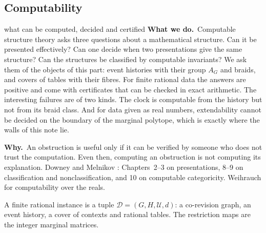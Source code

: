 \documentclass[11pt]{article}
\theoremstyle{definition}\newtheorem{definition}[theorem]{Definition}\newtheorem{remark}[theorem]{Remark}\newtheorem{example}[theorem]{Example}\newtheorem{problem}[theorem]{Open problem}\crefname{problem}{Problem}{Problems}
\newcommand{\rbwhat}{\textcolor{rbWhat}{\textbf{What we do.}}~}\newcommand{\rbwhy}{\par\smallskip\textcolor{rbWhy}{\textbf{Why.}}~}
\begin{document}
\subsection{Computability}\label{sec:computability}
\begin{readerbox}{what can be computed, decided and certified}
\rbwhat Computable structure theory asks three questions about a mathematical structure. Can it be presented effectively? Can one decide when two presentations give the same structure? Can the structures be classified by computable invariants? We ask them of the objects of this part: event histories with their group $A_G$ and braids, and covers of tables with their fibres. For finite rational data the answers are positive and come with certificates that can be checked in exact arithmetic. The interesting failures are of two kinds. The clock is computable from the history but not from its braid class. And for data given as real numbers, extendability cannot be decided on the boundary of the marginal polytope, which is exactly where the walls of this note lie.
\rbwhy An obstruction is useful only if it can be verified by someone who does not trust the computation. Even then, computing an obstruction is not computing its explanation.
\rbbg Downey and Melnikov \cite{DowneyMelnikov2025}: Chapters~2--3 on presentations, 8--9 on classification and nonclassification, and 10 on computable categoricity. Weihrauch \cite{Weihrauch2000} for computability over the reals.
\end{readerbox}

A finite rational instance is a tuple $\mathcal D=(G,H,\mathcal U,d)$: a co-revision graph, an event history, a cover of contexts and rational tables. The restriction maps are the integer marginal matrices.
\end{document}
